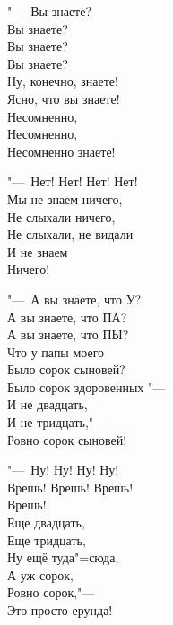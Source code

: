 \begin{flushleft}
"---~Вы знаете? \\
Вы знаете? \\
Вы знаете? \\
Вы знаете? \\
Ну, конечно, знаете! \\
Ясно, что вы знаете! \\
Несомненно, \\
Несомненно, \\
Несомненно знаете!
\end{flushleft}

\begin{flushright}
\begin{minipage}{0.5\textwidth}
"---~Нет! Нет! Нет! Нет! \\
Мы не знаем ничего, \\
Не слыхали ничего, \\
Не слыхали, не видали \\
И не знаем \\
Ничего!
\end{minipage}
\end{flushright}

\begin{flushleft}
"---~А вы знаете, что У? \\
А вы знаете, что ПА? \\
А вы знаете, что ПЫ? \\
Что у папы моего \\
Было сорок сыновей? \\
Было сорок здоровенных "--- \\
И не двадцать, \\
И не тридцать,"--- \\
Ровно сорок сыновей!
\end{flushleft}

\begin{flushright}
\begin{minipage}{0.5\textwidth}
"---~Ну! Ну! Ну! Ну! \\
Врешь! \quad Врешь! \quad Врешь! \\
Врешь! \\
Еще двадцать, \\
Еще тридцать, \\
Ну ещё туда"=сюда, \\
А уж сорок, \\
Ровно сорок,"--- \\
Это просто ерунда!
\end{minipage}
\end{flushright}

